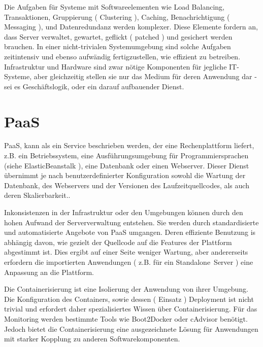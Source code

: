\documentclass[
12pt,
english,
ngerman,
headsepline,
twoside,
openright,
numbers=noenddot,version=first
]{scrreprt}
\begin{document}
Die Aufgaben\label{sec:iaas-aufgaben} für Systeme mit Softwareelementen wie Load Balancing, Transaktionen, Gruppierung ( Clustering ), Caching, Benachrichtigung ( Messaging ), und Datenredundanz werden komplexer. Diese Elemente fordern an, dass Server verwaltet, gewartet, geflickt ( patched ) und gesichert werden brauchen. In einer nicht-trivialen Systemumgebung sind solche Aufgaben zeitintensiv und ebenso aufwändig fertigzustellen, wie effizient zu betreiben. Infrastruktur und Hardware sind zwar nötige Komponenten für jegliche IT-Systeme, aber gleichzeitig stellen sie nur das Medium für deren Anwendung dar - sei es Geschäftslogik, oder ein darauf aufbauender Dienst.

\section{PaaS}
\label{sec:paas}
\acrfull{PaaS}, kann als ein Service beschrieben werden, der eine Rechenplattform liefert, z.B. ein Betriebssystem, eine Ausführungsumgebung für Programmiersprachen (siehe ElasticBeanstalk \cite{ebs}), eine Datenbank oder einen Webserver. Dieser Dienst übernimmt je nach benutzerdefinierter Konfiguration sowohl die Wartung der Datenbank, des Webservers und der Versionen des Laufzeitquellcodes, als auch deren Skalierbarkeit.\cite{patternAWS}.


Inkonsistenzen in der Infrastruktur oder den Umgebungen können durch den hohen Aufwand der Serververwaltung entstehen. Sie werden durch standardisierte und automatisierte Angebote von \acrshort{PaaS} umgangen. Deren effiziente Benutzung is abhängig davon, wie gezielt der Quellcode auf die Features der Plattform abgestimmt ist. Dies ergibt auf einer Seite weniger Wartung, aber andererseits erfordern die importierten Anwendungen ( z.B. für ein \glqq Standalone\grqq\ Server ) eine Anpassung an die Plattform.

Die Containerisierung\label{par:containerisation} ist eine Isolierung der Anwendung von ihrer Umgebung. Die Konfiguration des Containers, sowie dessen ( Einsatz ) Deployment ist nicht trivial und erfordert daher spezialisiertes Wissen über Containerisierung. Für das Monitoring werden bestimmte Tools wie Boot2Docker \cite{Boot2Docker} oder cAdvisor \cite{cAdvisor} benötigt. Jedoch bietet die Containerisierung eine ausgezeichnete Lösung für Anwendungen mit starker Kopplung zu anderen Softwarekomponenten.\cite{patternAWS}

\end{document}
